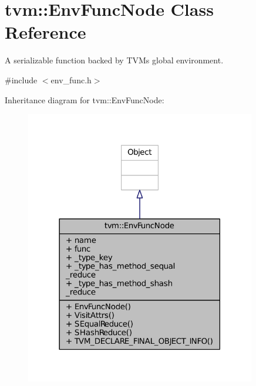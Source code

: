 \hypertarget{classtvm_1_1EnvFuncNode}{}\section{tvm\+:\+:Env\+Func\+Node Class Reference}
\label{classtvm_1_1EnvFuncNode}


A serializable function backed by T\+VM\textquotesingle{}s global environment.  




{\ttfamily \#include $<$env\+\_\+func.\+h$>$}



Inheritance diagram for tvm\+:\+:Env\+Func\+Node\+:
\nopagebreak
\begin{figure}[H]
\begin{center}
\leavevmode
\includegraphics[width=285pt]{classtvm_1_1EnvFuncNode__inherit__graph}
\end{center}
\end{figure}


